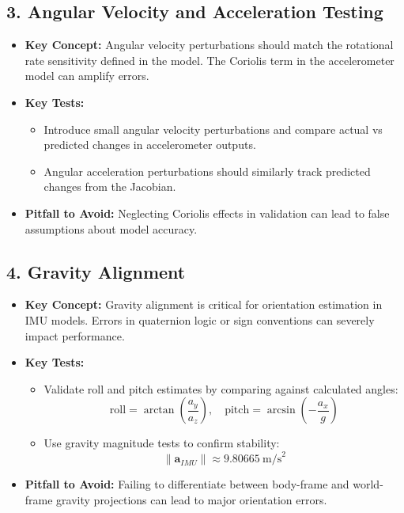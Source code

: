 \documentclass{article}
\begin{document}
\subsection*{3. Angular Velocity and Acceleration Testing}
\begin{itemize}
	\item \textbf{Key Concept:} Angular velocity perturbations should match the rotational rate sensitivity defined in the model. The Coriolis term in the accelerometer model can amplify errors.
	\item \textbf{Key Tests:}
	\begin{itemize}
		\item Introduce small angular velocity perturbations and compare actual vs predicted changes in accelerometer outputs.
		\item Angular acceleration perturbations should similarly track predicted changes from the Jacobian.
	\end{itemize}
	\item \textbf{Pitfall to Avoid:} Neglecting Coriolis effects in validation can lead to false assumptions about model accuracy.
\end{itemize}

\subsection*{4. Gravity Alignment}
\begin{itemize}
	\item \textbf{Key Concept:} Gravity alignment is critical for orientation estimation in IMU models. Errors in quaternion logic or sign conventions can severely impact performance.
	\item \textbf{Key Tests:}
	\begin{itemize}
		\item Validate roll and pitch estimates by comparing against calculated angles:
		\[ \text{roll} = \arctan\left(\frac{a_y}{a_z}\right), \quad \text{pitch} = \arcsin\left(-\frac{a_x}{g}\right) \]
		\item Use gravity magnitude tests to confirm stability:
		\[ \| \mathbf{a}_{IMU} \| \approx 9.80665 \ \text{m/s}^2 \]
	\end{itemize}
	\item \textbf{Pitfall to Avoid:} Failing to differentiate between body-frame and world-frame gravity projections can lead to major orientation errors.
\end{itemize}
\end{document}
